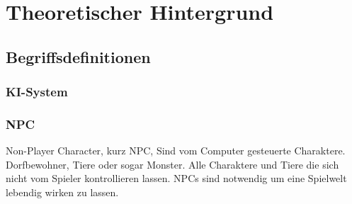\documentclass[12pt,a4paper,bibliography=totocnumbered,listof=totocnumbered]{scrartcl}
\begin{document}
\section{Theoretischer Hintergrund}

\subsection{Begriffsdefinitionen}%

\subsubsection{KI-System}
\subsubsection{NPC}%
Non-Player Character, kurz NPC, Sind vom Computer gesteuerte Charaktere. Dorfbewohner, Tiere oder sogar Monster. Alle Charaktere und Tiere die sich nicht vom Spieler kontrollieren lassen. NPCs sind notwendig um eine Spielwelt lebendig wirken zu lassen.
\end{document}
